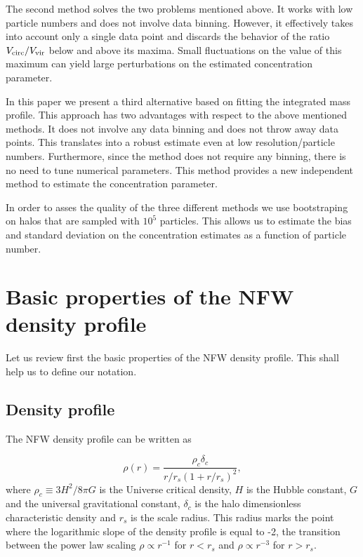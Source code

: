 \documentclass{emulateapj}
\begin{document}
The second method solves the two problems mentioned above.  
It works with low particle numbers and does not involve data binning.  
However,
it effectively takes into account only a single data point and
discards the behavior of the ratio $V_{\rm circ}/V_{\rm vir}$ below
and above its maxima.  
Small fluctuations on the value of this maximum
can yield large perturbations on the estimated concentration
parameter.


In this paper we present a third alternative based on fitting the
integrated mass profile.  
This approach has two advantages with respect to the above mentioned methods.  
It does not involve any data binning and does not throw away data points.  
This translates into a robust estimate even at low resolution/particle numbers.  
Furthermore, since the method does not require any binning, there is no need to
tune numerical parameters.   
This method provides a new independent method to estimate the
concentration parameter.   

In order to asses the quality of the three different methods we use
bootstraping on halos that are sampled with $10^{5}$ particles.
This allows us to estimate the bias and standard deviation on the
concentration estimates as a function of particle number.







\section{Basic properties of the NFW density profile}
\label{sec:basics}

Let us review first the basic properties of the NFW density profile.
This shall help us to define our notation.

\subsection{Density profile}

The NFW density profile can be written as

\begin{equation}
\rho(r) = \frac{\rho_c\delta_c}{r/r_s(1+r/r_s)^2},
\label{eq:definition}
\end{equation}
%
where $\rho_c\equiv 3H^2/8\pi G$ is the Universe critical density, $H$
is the Hubble constant, $G$ and the universal gravitational constant,
$\delta_c$ is the halo dimensionless characteristic density and $r_s$
is the scale radius.  This radius marks the point where the
logarithmic slope of the density profile is equal to -2, the
transition between the power law scaling $\rho\propto r^{-1}$ for
$r<r_s$ and $\rho\propto r^{-3}$ for $r>r_s$.
\end{document}
